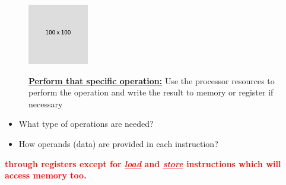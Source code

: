 \documentclass[
  14pt,
  a4paper,
  DIV=11,
  numbers=noendperiod,
  headinclude=true,
  footinclude=true]{scrreprt}
\providecommand{\tightlist}{%
  \setlength{\itemsep}{0pt}\setlength{\parskip}{0pt}}\usepackage{longtable,booktabs,array}
\begin{document}
\begin{figure}[H]

\begin{minipage}{0.30\linewidth}

\includegraphics{index_files/mediabag/FiKGhYhhIWJYiBgWIoaF.png}\end{minipage}%
%
\begin{minipage}{0.70\linewidth}

\begin{tcolorbox}[colback=boxbodycol, colframe=boxheadcol, colbacktitle=boxheadcol, title=\textcolor{red}{\underline{\textbf{Execution}}}]
\underline{\textbf{Perform that specific operation:}} Use the processor
resources to perform the operation and write the result to memory or
register if necessary

\end{tcolorbox}

\end{minipage}%

\end{figure}%

\begin{tcolorbox}[colback=boxbodycol, colframe=boxbodycol]

\begin{itemize}
\tightlist
\item
  What type of operations are needed?
\end{itemize}

\end{tcolorbox}

\begin{tcolorbox}[colback=boxbodycol, colframe=boxbodycol]

\begin{itemize}
\tightlist
\item
  How operands (data) are provided in each instruction?
\end{itemize}

\end{tcolorbox}

\textcolor{red}{\textbf{through registers except for
\underline{\textit{load}} and \underline{\textit{store}} instructions
which will access memory too.}}
\end{document}
